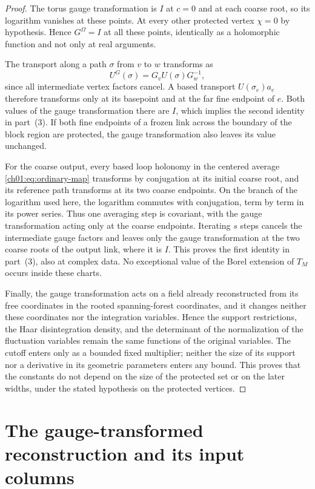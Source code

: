 \begin{proof}
The torus gauge transformation is $I$ at $c=0$ and at each coarse root, so its logarithm vanishes at these points. At every other protected vertex $\chi=0$ by hypothesis. Hence $G^\Omega=I$ at all these points, identically as a holomorphic function and not only at real arguments.

The transport along a path $\sigma$ from $v$ to $w$ transforms as
\[
 U^{G}(\sigma)=G_vU(\sigma)G_w^{-1},
\]
since all intermediate vertex factors cancel. A based transport $U(\sigma_e)a_e$ therefore transforms only at its basepoint and at the far fine endpoint of $e$. Both values of the gauge transformation there are $I$, which implies the second identity in part~(3). If both fine endpoints of a frozen link across the boundary of the block region are protected, the gauge transformation also leaves its value unchanged.

For the coarse output, every based loop holonomy in the centered average \eqref{ch01:eq:ordinary-map} transforms by conjugation at its initial coarse root, and its reference path transforms at its two coarse endpoints. On the branch of the logarithm used here, the logarithm commutes with conjugation, term by term in its power series. Thus one averaging step is covariant, with the gauge transformation acting only at the coarse endpoints. Iterating $s$ steps cancels the intermediate gauge factors and leaves only the gauge transformation at the two coarse roots of the output link, where it is $I$. This proves the first identity in part~(3), also at complex data. No exceptional value of the Borel extension of $T_M$ occurs inside these charts.

Finally, the gauge transformation acts on a field already reconstructed from its free coordinates in the rooted spanning-forest coordinates, and it changes neither these coordinates nor the integration variables. Hence the support restrictions, the Haar disintegration density, and the determinant of the normalization of the fluctuation variables remain the same functions of the original variables. The cutoff enters only as a bounded fixed multiplier; neither the size of its support nor a derivative in its geometric parameters enters any bound. This proves that the constants do not depend on the size of the protected set or on the later widths, under the stated hypothesis on the protected vertices.
\end{proof}

\section{The gauge-transformed reconstruction and its input columns}\label{ch16:sec:reconstruction}

